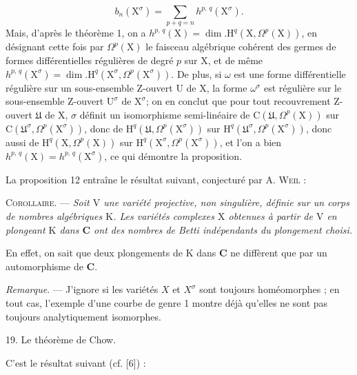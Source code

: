 \begin{equation*}
b_n(\mathrm{X}^\sigma) = \sum_{p + q = n} h^{p,\,q}(\mathrm{X}^\sigma).
\end{equation*}
Mais, d'après le théorème 1, on a $h^{p,\,q}(\mathrm{X}) = \dim. \mathrm{H}^q(\mathrm{X}, \Omega^p(\mathrm{X}))$, en désignant cette fois par $\Omega^p(\mathrm{X})$ le faisceau algébrique cohérent des germes de formes différentielles régulières de degré $p$ sur $\mathrm{X}$, et de même $h^{p,\,q}(\mathrm{X}^\sigma) = \dim. \mathrm{H}^q(\mathrm{X}^\sigma, \Omega^p(\mathrm{X}^\sigma))$. De plus, si $\omega$ est une forme différentielle régulière sur un sous-ensemble Z-ouvert $\mathrm{U}$ de $\mathrm{X}$, la forme $\omega^\sigma$ est régulière sur le sous-ensemble Z-ouvert $\mathrm{U}^\sigma$ de $\mathrm{X}^\sigma$; on en conclut que pour tout recouvrement Z-ouvert $\mathfrak{U}$ de $\mathrm{X}$, $\sigma$ définit un isomorphisme semi-linéaire de $\mathrm{C}(\mathfrak{U}, \Omega^p(\mathrm{X}))$ sur $\mathrm{C}(\mathfrak{U}^\sigma, \Omega^p(\mathrm{X}^\sigma))$, donc de $\mathrm{H}^q(\mathfrak{U}, \Omega^p(\mathrm{X}^\sigma))$ sur $\mathrm{H}^q(\mathfrak{U}^\sigma, \Omega^p(\mathrm{X}^\sigma))$, donc aussi de $\mathrm{H}^q(\mathrm{X}, \Omega^p(\mathrm{X}))$ sur $\mathrm{H}^q(\mathrm{X}^\sigma, \Omega^p(\mathrm{X}^\sigma))$, et l'on a bien $h^{p,\,q}(\mathrm{X}) = h^{p,\,q}(\mathrm{X}^\sigma)$, ce qui démontre la proposition.

La proposition 12 entraîne le résultat suivant, conjecturé par A. \textsc{Weil} :

\textsc{Corollaire}. --- \textit{Soit $\mathrm{V}$ une variété projective, non singulière, définie sur un corps de nombres algébriques $\mathrm{K}$. Les variétés complexes $\mathrm{X}$ obtenues à partir de $\mathrm{V}$ en plongeant $\mathrm{K}$ dans $\mathbf{C}$ ont des nombres de Betti indépendants du plongement choisi.}

En effet, on sait que deux plongements de $\mathrm{K}$ dans $\mathbf{C}$ ne diffèrent que par un automorphisme de $\mathbf{C}$.



\textit{Remarque}. --- J'ignore si les variétés $X$ et $X^\sigma$ sont toujours homéomorphes ; en tout cas, l'exemple d'une courbe de genre 1 montre déjà qu'elles ne sont pas toujours analytiquement isomorphes.


19. Le théorème de Chow.

C'est le résultat suivant (cf. [6]) :

